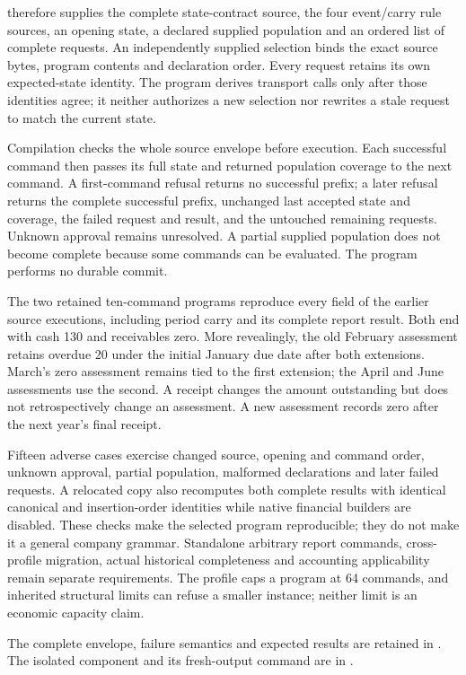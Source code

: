  therefore supplies the complete state-contract
source, the four event/carry rule sources, an opening state, a declared supplied
population and an ordered list of complete requests. An independently supplied
selection binds the exact source bytes, program contents and declaration order.
Every request retains its own expected-state identity. The program derives
transport calls only after those identities agree; it neither authorizes a
new selection nor rewrites a stale request to match the current state.

Compilation checks the whole source envelope before execution. Each successful
command then passes its full state and returned population coverage to the next
command. A first-command refusal returns no successful prefix; a later refusal
returns the complete successful prefix, unchanged last accepted state and
coverage, the failed request and result, and the untouched remaining requests.
Unknown approval remains unresolved. A partial supplied population does not
become complete because some commands can be evaluated. The program performs
no durable commit.

The two retained ten-command programs reproduce every field of the earlier
source executions, including period carry and its complete report result.
Both end with cash 130 and receivables zero. More revealingly, the old February
assessment retains overdue 20 under the initial January due date after both
extensions. March's zero assessment remains tied to the first extension;
the April and June assessments use the second. A receipt changes the amount
outstanding but does not retrospectively change an assessment. A new assessment
records zero after the next year's final receipt.

Fifteen adverse cases exercise changed source, opening and command order,
unknown approval, partial population, malformed declarations and later failed
requests. A relocated copy also recomputes both complete results with identical
canonical and insertion-order identities while native financial builders are
disabled. These checks make the selected program reproducible; they do not
make it a general company grammar. Standalone arbitrary report commands,
cross-profile migration, actual historical completeness and accounting
applicability remain separate requirements. The profile caps a program at
64 commands, and inherited structural limits can refuse a smaller instance;
neither limit is an economic capacity claim.

\begingroup\raggedright
The complete envelope, failure semantics and expected results are retained in
. The isolated
component and its fresh-output command are in
.
\par\endgroup
